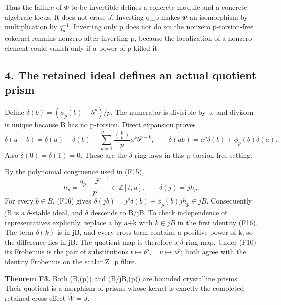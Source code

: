 \documentclass[
]{article}
\begin{document}
Thus the failure of \(\Phi\) to be invertible defines a concrete module
and a concrete algebraic locus. It does not erase \(\widehat J\).
Inverting q\_p makes \(\Phi\) an isomorphism by multiplication by
\(q_p^{-1}\). Inverting only p does not do so: the nonzero
p-torsion-free cokernel remains nonzero after inverting p, because the
localization of a nonzero element could vanish only if a power of p
killed it.

\subsection{4. The retained ideal defines an actual quotient
prism}\label{the-retained-ideal-defines-an-actual-quotient-prism}

Define \(\delta(b)=(\phi_p(b)-b^p)/p\). The numerator is divisible by p,
and division is unique because B has no p-torsion. Direct expansion
proves \[
\delta(a+b)=\delta(a)+\delta(b)
-\sum_{k=1}^{p-1}\frac{\binom pk}{p}a^kb^{p-k},
\qquad
\delta(ab)=a^p\delta(b)+\phi_p(b)\delta(a).
\tag{F16}
\] Also \(\delta(0)=\delta(1)=0\). These are the \(\delta\)-ring laws in
this p-torsion-free setting.

By the polynomial congruence used in (F15), \[
h_p=\frac{q_p-j^{p-1}}p\in\mathbb Z[t,u],
\qquad \delta(j)=jh_p.
\tag{F17}
\] For every \(b\in B\), (F16) gives
\(\delta(jb)=j^p\delta(b)+\phi_p(b)jh_p\in jB\). Consequently jB is a
\(\delta\)-stable ideal, and \(\delta\) descends to B/jB. To check
independence of representatives explicitly, replace a by a+k with
\(k\in jB\) in the first identity (F16). The term \(\delta(k)\) is in
jB, and every cross term contains a positive power of k, so the
difference lies in jB. The quotient map is therefore a \(\delta\)-ring
map. Under (F10) its Frobenius is the pair of substitutions
\(t\mapsto t^p,\quad u\mapsto u^p\); both agree with the identity
Frobenius on the scalar Z\_p fibre.

\textbf{Theorem F3.} Both (B,(p)) and (B/jB,(p)) are bounded crystalline
prisms. Their quotient is a morphism of prisms whose kernel is exactly
the completed retained cross-effect \(\widehat W=\widehat J\).
\end{document}
